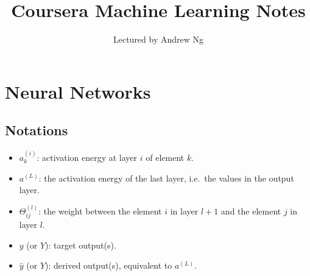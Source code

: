 \documentclass[11pt]{report}
\author{Lectured by Andrew Ng}
\title{Coursera Machine Learning Notes}
\affil{Typed by Aris Zhu Yi Qing}
\theoremstyle{definition}
\begin{document}
\maketitle
\tableofcontents

\chapter{Neural Networks}

\section{Notations}
\begin{itemize}
    \item $a^{(i)}_{k}$: activation energy at layer $i$ of element $k$.
    \item $a^{(L)}$: the activation energy of the last layer,
        i.e.\ the values in the output layer.
    \item $\Theta_{ij}^{(l)}$: the weight 
        between the element $i$ in layer $l + 1$ 
        and the element $j$ in layer $l$.
    \item $y$ (or $Y$): target output(s).
    \item $\hat{y}$ (or $\hat{Y}$): derived output(s), equivalent to $a^{(L)}$.
\end{itemize} 
\end{document}
